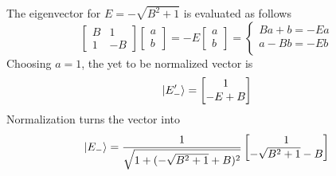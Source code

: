 \documentclass[../../../main.tex]{subfiles}
\begin{document}
The eigenvector for $E = -\sqrt{B^2+1}$ is evaluated as follows
\begin{equation*}
    \begin{bmatrix}
        B & 1  \\
        1 & -B
    \end{bmatrix}
    \begin{bmatrix}
        a \\
        b
    \end{bmatrix}
    = -E
    \begin{bmatrix}
        a \\
        b
    \end{bmatrix}
    = \begin{cases}
        Ba+b=-Ea\\
        a-Bb=-Eb\\
    \end{cases}
\end{equation*}
Choosing $a=1$, the yet to be normalized vector is
\begin{equation*}
    \ket{E_-'} =
    \begin{bmatrix}
        1 \\ -E+B
    \end{bmatrix}
\end{equation*}
Normalization turns the vector into
\begin{equation*}
    \ket{E_-} =
    \frac{1 }{\sqrt{1+(-\sqrt{B^2+1}+B)^2}}
    \begin{bmatrix}
        1 \\ -\sqrt{B^2+1}-B
    \end{bmatrix}
\end{equation*}
\end{document}
